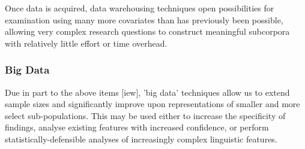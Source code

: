 Once data is acquired, data warehousing techniques open possibilities for examination using many more covariates than has previously been possible, allowing very complex research questions to construct meaningful subcorpora with relatively little effort or time overhead.


\subsubsection{Big Data}
Due in part to the above items [iew], 'big data' techniques allow us to extend sample sizes and significantly improve upon representations of smaller and more select sub-populations.  This may be used either to increase the specificity of findings, analyse existing features with increased confidence, or perform statistically-defensible analyses of increasingly complex linguistic features.







